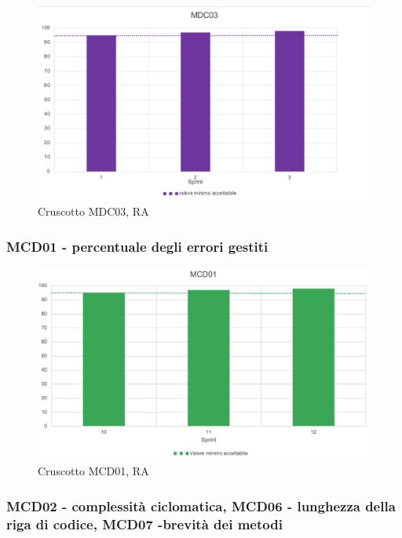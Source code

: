 \begin{figure}[H] 
    \centering
    \includegraphics[scale = 0.8]{immagini/ImmRA/MDC03.png}
    \caption{Cruscotto MDC03, RA}
\end{figure}

\subsubsection*{MCD01 - percentuale degli errori gestiti}

\begin{figure}[H] 
    \centering
    \includegraphics[scale = 0.65]{immagini/ImmRA/MCD01.png}
    \caption{Cruscotto MCD01, RA}
\end{figure}

\subsubsection*{MCD02 - complessità ciclomatica, MCD06 - lunghezza della riga di codice, MCD07 -brevità dei metodi }


